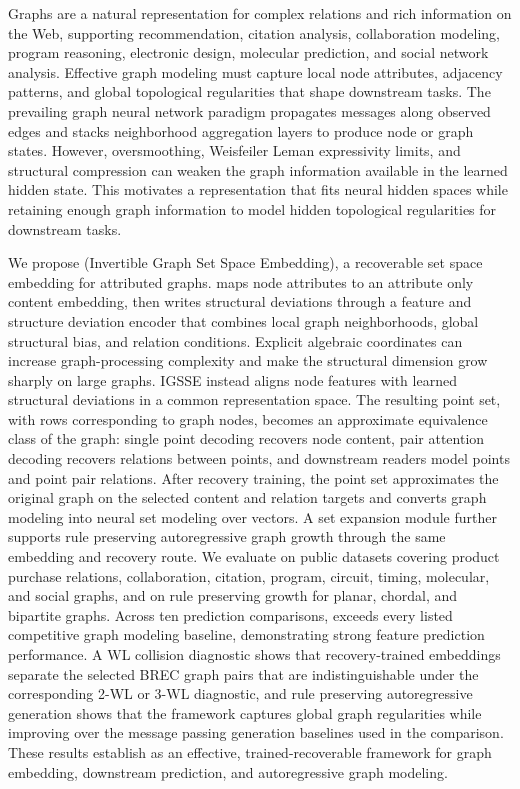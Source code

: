 Graphs are a natural representation for complex relations and rich information
on the Web, supporting recommendation, citation analysis, collaboration
modeling, program reasoning, electronic design, molecular prediction, and social
network analysis.  Effective graph modeling must capture local node attributes,
adjacency patterns, and global topological regularities that shape downstream
tasks.  The prevailing graph neural network paradigm propagates messages along
observed edges and stacks neighborhood aggregation layers to produce node or
graph states.  However, oversmoothing, Weisfeiler Leman expressivity limits, and
structural compression can weaken the graph information available in the learned
hidden state.  This motivates a representation that fits neural hidden spaces
while retaining enough graph information to model hidden topological regularities
for downstream tasks.

We propose \method{} (Invertible Graph Set Space Embedding), a recoverable set
space embedding for attributed graphs.  \method{} maps node attributes to an
attribute only content embedding, then writes structural deviations through a
feature and structure deviation encoder that combines local graph neighborhoods,
global structural bias, and relation conditions.  Explicit algebraic coordinates
can increase graph-processing complexity and make the structural dimension grow
sharply on large graphs.  IGSSE instead aligns node features with learned
structural deviations in a common representation space.  The resulting point set, with
rows corresponding to graph nodes, becomes an approximate equivalence class of
the graph: single point decoding recovers node content, pair attention decoding
recovers relations between points, and downstream readers model points and point
pair relations.  After recovery training, the point set approximates the
original graph on the selected content and relation targets and converts graph modeling into neural set
modeling over vectors.  A set expansion module further supports rule preserving
autoregressive graph growth through the same embedding and recovery route.  We evaluate
\method{} on public datasets covering product purchase relations,
collaboration, citation, program, circuit, timing, molecular, and social graphs,
and on rule preserving growth for planar, chordal, and bipartite graphs.  Across
ten prediction comparisons, \method{} exceeds every listed competitive graph
modeling baseline, demonstrating strong feature prediction performance.  A WL
collision diagnostic shows that recovery-trained embeddings separate the
selected BREC graph pairs that are indistinguishable under the corresponding
2-WL or 3-WL diagnostic, and rule
preserving autoregressive generation shows that the framework captures global
graph regularities while improving over the message passing generation baselines
used in the comparison.  These results establish \method{} as an effective,
trained-recoverable framework for graph embedding, downstream prediction, and
autoregressive graph modeling.
